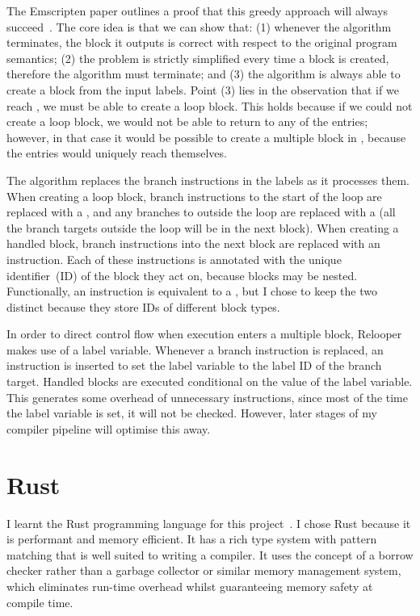\documentclass[00-main.tex]{subfiles}
\begin{document}
The Emscripten paper outlines a proof that this greedy approach will always succeed~.
The core idea is that we can show that: (1) whenever the algorithm terminates, the block it outputs is correct with respect to the original program semantics; (2) the problem is strictly simplified every time a block is created, therefore the algorithm must terminate; and (3) the algorithm is always able to create a block from the input labels.
Point (3) lies in the observation that if we reach , we must be able to create a loop block.
This holds because if we could not create a loop block, we would not be able to return to any of the entries; however, in that case it would be possible to create a multiple block in , because the entries would uniquely reach themselves.

The algorithm replaces the branch instructions in the labels as it processes them.
When creating a loop block, branch instructions to the start of the loop are replaced with a , and any branches to outside the loop are replaced with a  (all the branch targets outside the loop will be in the next block).
When creating a handled block, branch instructions into the next block are replaced with an  instruction.
Each of these instructions is annotated with the unique identifier~(ID) of the block they act on, because blocks may be nested.
Functionally, an  instruction is equivalent to a , but I chose to keep the two distinct because they store IDs of different block types.

In order to direct control flow when execution enters a multiple block, Relooper makes use of a label variable.
Whenever a branch instruction is replaced, an instruction is inserted to set the label variable to the label ID of the branch target.
Handled blocks are executed conditional on the value of the label variable.
This generates some overhead of unnecessary instructions, since most of the time the label variable is set, it will not be checked.
However, later stages of my compiler pipeline will optimise this away.


\section{Rust}\label{sec:prep:rust}

I learnt the Rust programming language for this project~.
I chose Rust because it is performant and memory efficient.
It has a rich type system with pattern matching that is well suited to writing a compiler.
It uses the concept of a borrow checker rather than a garbage collector or similar memory management system, which eliminates run-time overhead whilst guaranteeing memory safety at compile time.
\end{document}
